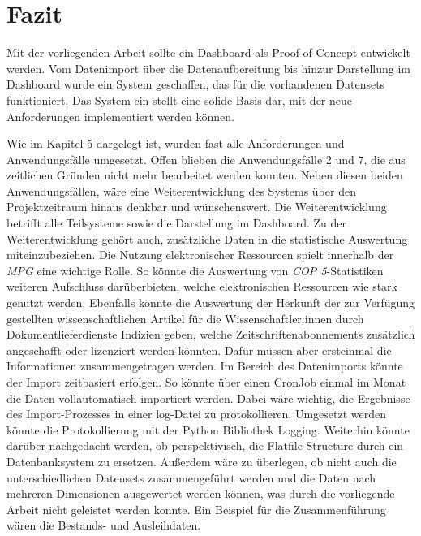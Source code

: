 
\chapter{Fazit}
\label{chap:six}
Mit der vorliegenden Arbeit sollte ein Dashboard als Proof-of-Concept entwickelt werden.
Vom Datenimport über die Datenaufbereitung bis hinzur Darstellung im Dashboard wurde ein System geschaffen,
das für die vorhandenen Datensets funktioniert. 
Das System ein stellt eine solide Basis dar, mit der neue Anforderungen implementiert werden können.

Wie im Kapitel 5 dargelegt ist, wurden fast alle Anforderungen und Anwendungsfälle umgesetzt.
Offen blieben die Anwendungsfälle 2 und 7, die aus zeitlichen Gründen nicht mehr bearbeitet werden konnten.
Neben diesen beiden Anwendungsfällen, wäre eine Weiterentwicklung des Systems über den Projektzeitraum hinaus denkbar und wünschenswert.
Die Weiterentwicklung betrifft alle Teilsysteme sowie die Darstellung im Dashboard. 
Zu der Weiterentwicklung gehört auch, zusätzliche Daten  in die statistische Auswertung miteinzubeziehen. 
Die Nutzung elektronischer Ressourcen spielt innerhalb der \textit{\acrshort{MPG}} eine wichtige Rolle.
So könnte die Auswertung von \textit{\acrshort{COP 5}}-Statistiken weiteren Aufschluss darüberbieten, welche elektronischen Ressourcen wie stark genutzt werden.
Ebenfalls könnte die Auswertung der Herkunft der zur Verfügung gestellten wissenschaftlichen Artikel für die Wissenschaftler:innen durch Dokumentlieferdienste
Indizien geben, welche Zeitschriftenabonnements zusätzlich angeschafft oder lizenziert werden könnten. Dafür müssen aber ersteinmal die Informationen zusammengetragen
werden.
Im Bereich des Datenimports könnte der Import zeitbasiert erfolgen. So könnte über einen CronJob einmal im Monat die
Daten vollautomatisch importiert werden. Dabei wäre wichtig, die Ergebnisse des Import-Prozesses in einer log-Datei zu protokollieren.
Umgesetzt werden könnte die Protokollierung mit der Python Bibliothek Logging. Weiterhin könnte darüber nachgedacht werden, ob perspektivisch,
die Flatfile-Structure durch ein Datenbanksystem zu ersetzen. Außerdem wäre zu überlegen, ob nicht auch die
unterschiedlichen Datensets zusammengeführt werden und die Daten nach mehreren Dimensionen ausgewertet werden können, was durch die vorliegende
Arbeit nicht geleistet werden konnte. Ein Beispiel für die Zusammenführung wären die Bestands- und Ausleihdaten.

